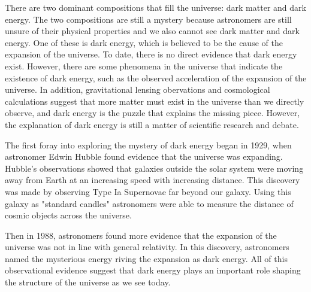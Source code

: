 \documentclass[12pt,times new roman, 2pt, a4paper]{report}
\begin{document}
There are two dominant compositions that fill the universe: dark matter and dark energy. The two compositions are still a mystery because astronomers are still unsure of their physical properties and we also cannot see dark matter and dark energy. One of these is dark energy, which is believed to be the cause of the expansion of the universe. To date, there is no direct evidence that dark energy exist. However, there are some phenomena in the universe that indicate the existence of dark energy, such as the observed acceleration of the expansion of the universe. In addition, gravitational lensing obervations and cosmological calculations suggest that more matter must exist in the universe than we directly observe, and dark energy is the puzzle that explains the missing piece. However, the explanation of dark energy is still a matter of scientific research and debate.\

The first foray into exploring the mystery of dark energy began in 1929, when astronomer Edwin Hubble found evidence that the universe was expanding. Hubble's observations showed that galaxies outside the solar system were moving away from Earth at an increasing speed with increasing distance. This discovery was made by observing Type Ia Supernovae far beyond our galaxy. Using this galaxy as "standard candles" astronomers were able to measure the distance of cosmic objects across the universe.\

Then in 1988, astronomers found more evidence that the expansion of the universe was not in line with general relativity. In this discovery, astronomers named the mysterious energy riving the expansion as dark energy. All of this observational evidence suggest that dark energy plays an important role shaping the structure of the universe as we see today.
\end{document}
